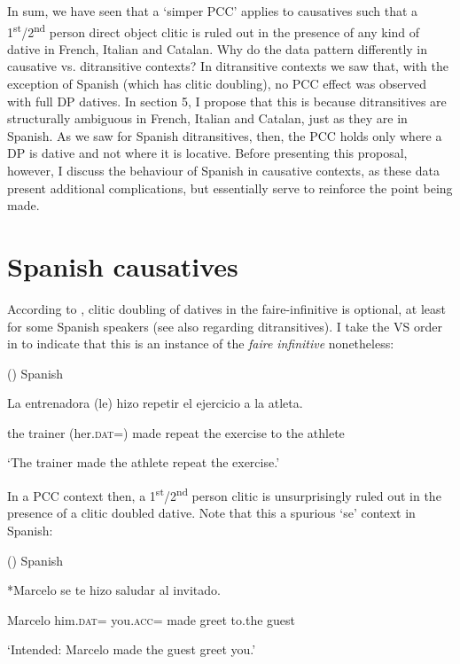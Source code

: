 \documentclass[output=paper,modfonts,nonflat]{langsci/langscibook}
\begin{document}
In sum, we have seen that a ‘simper PCC’ applies to causatives such that a 1\textsuperscript{st}/2\textsuperscript{nd} person direct object clitic is ruled out in the presence of any kind of dative in French, Italian and Catalan. Why do the data pattern differently in causative vs. ditransitive contexts? In ditransitive contexts we saw that, with the exception of Spanish (which has clitic doubling), no PCC effect was observed with full DP datives. In section 5, I propose that this is because ditransitives are structurally ambiguous in French, Italian and Catalan, just as they are in Spanish. As we saw for Spanish ditransitives, then, the PCC holds only where a DP is dative and not where it is locative. Before presenting this proposal, however, I discuss the behaviour of Spanish in causative contexts, as these data present additional complications, but essentially serve to reinforce the point being made. 

\section{Spanish causatives} %

According to \citet{Torrego2010}, clitic doubling of datives in the faire-infinitive is optional, at least for some Spanish speakers (see also \citealt{Pineda2013} regarding ditransitives). I take the VS order in  to indicate that this is an instance of the \textit{faire} \textit{infinitive} nonetheless:

()  Spanish \citep[448]{Torrego2010}

La   entrenadora  (le)   hizo   repetir  el   ejercicio   a     la   atleta.

the   trainer   (her.\textsc{dat}=)   made   repeat  the   exercise   to   the  athlete

‘The trainer made the athlete repeat the exercise.’

In a PCC context then, a 1\textsuperscript{st}/2\textsuperscript{nd} person clitic is unsurprisingly ruled out in the presence of a clitic doubled dative. Note that this a spurious ‘se’ context in Spanish:

()  Spanish

*Marcelo   se   te   hizo   saludar  al   invitado.  

Marcelo   him.\textsc{dat}=  you.\textsc{acc}=  made   greet  to.the   guest

  ‘Intended: Marcelo made the guest greet you.’
\end{document}
